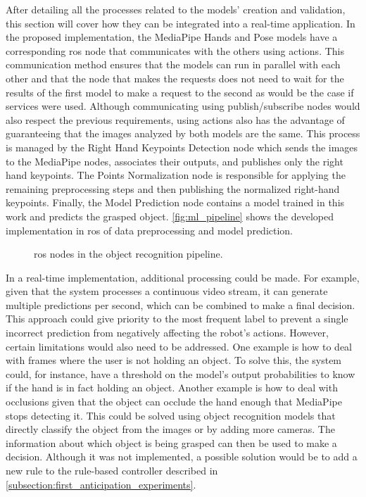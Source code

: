 After detailing all the processes related to the models' creation and validation, this section will cover how they can be integrated into a real-time application. In the proposed implementation, the MediaPipe Hands and Pose models have a corresponding \acs{ros} node that communicates with the others using actions. This communication method ensures that the models can run in parallel with each other and that the node that makes the requests does not need to wait for the results of the first model to make a request to the second as would be the case if services were used. Although communicating using publish/subscribe nodes would also respect the previous requirements, using actions also has the advantage of guaranteeing that the images analyzed by both models are the same. This process is managed by the Right Hand Keypoints Detection node which sends the images to the MediaPipe nodes, associates their outputs, and publishes only the right hand keypoints. The Points Normalization node is responsible for applying the remaining preprocessing steps and then publishing the normalized right-hand keypoints. Finally, the Model Prediction node contains a model trained in this work and predicts the grasped object. \autoref{fig:ml_pipeline} shows the developed implementation in \acs{ros} of data preprocessing and model prediction.

\begin{figure}[ht]
    \centering
    
    \caption{\acs{ros} nodes in the object recognition pipeline.}
    \label{fig:ml_pipeline}
\end{figure}


In a real-time implementation, additional processing could be made. For example, given that the system processes a continuous video stream, it can generate multiple predictions per second, which can be combined to make a final decision. This approach could give priority to the most frequent label to prevent a single incorrect prediction from negatively affecting the robot's actions. However, certain limitations would also need to be addressed. One example is how to deal with frames where the user is not holding an object. To solve this, the system could, for instance, have a threshold on the model's output probabilities to know if the hand is in fact holding an object. Another example is how to deal with occlusions given that the object can occlude the hand enough that MediaPipe stops detecting it. This could be solved using object recognition models that directly classify the object from the images or by adding more cameras. The information about which object is being grasped can then be used to make a decision. Although it was not implemented, a possible solution would be to add a new rule to the rule-based controller described in \autoref{subsection:first_anticipation_experiments}.

